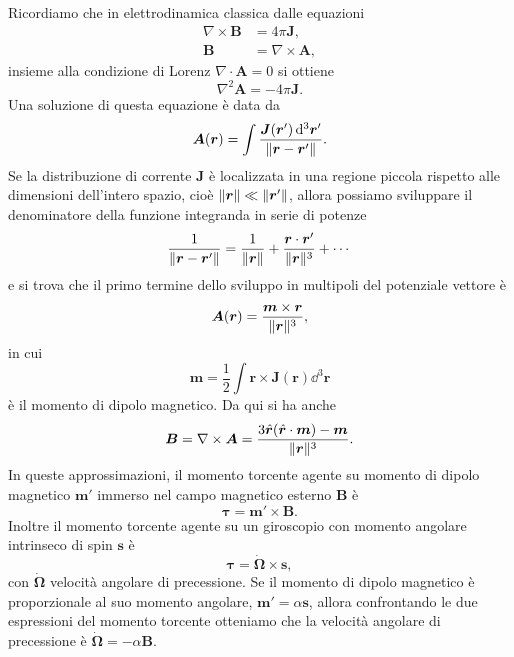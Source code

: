 Ricordiamo che in elettrodinamica classica dalle equazioni
\begin{subequations}
  \begin{align}
    \nabla\times\bm{B} &= 4\pi \bm{J}, \\
    \bm{B} &= \nabla\times\bm{A},
  \end{align}
\end{subequations}
insieme alla condizione di Lorenz $\nabla\cdot\bm{A} = 0$ si ottiene
\begin{equation}
  \nabla^{2} \bm{A} = -4\pi\bm{J}.
\end{equation}
Una soluzione di questa equazione è data da
\begin{equation}
  \bm{A}(\bm{r}) = \int \frac{\bm{J}(\bm{r}') \mathop{}\!\mathrm{d}^{3} \bm{r}'}{\lVert\bm{r} -
      \bm{r}'\rVert}.
\end{equation}
Se la distribuzione di corrente $\bm{J}$ è localizzata in una regione piccola
rispetto alle dimensioni dell'intero spazio, cioè
$\lVert\bm{r}\rVert \ll \lVert\bm{r}'\rVert$, allora possiamo sviluppare il denominatore
della funzione integranda in serie di potenze
\begin{equation}
  \frac{1}{\lVert\bm{r} - \bm{r}'\rVert} = \frac{1}{\lVert\bm{r}\rVert} +
  \frac{\bm{r}\cdot\bm{r}'}{\lVert\bm{r}\rVert^{3}} + \cdots
\end{equation}
e si trova che il primo termine dello sviluppo in multipoli del potenziale
vettore è
\begin{equation}
  \bm{A}(\bm{r}) = \frac{\bm{m} \times \bm{r}}{\lVert\bm{r}\rVert^{3}},
\end{equation}
in cui
\begin{equation}
  \bm{m} = \frac{1}{2} \int \bm{r} \times \bm{J}(\bm{r}) \dd^{3} \bm{r}
\end{equation}
è il momento di dipolo magnetico.  Da qui si ha anche
\begin{equation}
  \bm{B} = \nabla \times \bm{A} = \frac{3 \hat{\bm{r}}(\hat{\bm{r}} \cdot \bm{m}) -
    \bm{m}}{\lVert\bm{r}\rVert^{3}}.
\end{equation}
In queste approssimazioni, il momento torcente agente su momento di dipolo
magnetico $\bm{m}'$ immerso nel campo magnetico esterno $\bm{B}$ è
\begin{equation}
  \bm{\tau} = \bm{m}' \times \bm{B}.
\end{equation}
Inoltre il momento torcente agente su un giroscopio con momento angolare
intrinseco di spin $\bm{s}$ è
\begin{equation}
  \bm{\tau} = \dot{\bm{\Omega}} \times \bm{s},
\end{equation}
con $\dot{\bm{\Omega}}$ velocità angolare di precessione.  Se il momento di
dipolo magnetico è proporzionale al suo momento angolare,
$\bm{m}' = \alpha \bm{s}$, allora confrontando le due espressioni del momento
torcente otteniamo che la velocità angolare di precessione è
$\dot{\bm{\Omega}} = -\alpha \bm{B}$.

